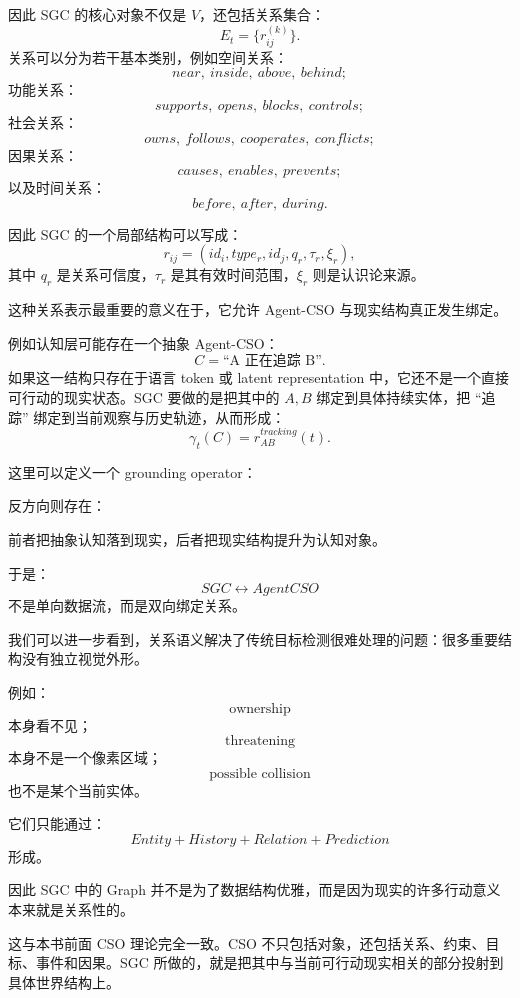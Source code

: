 因此 SGC 的核心对象不仅是 \(V\)，还包括关系集合：
\[
E_t
=
\{
r_{ij}^{(k)}
\}.
\]
关系可以分为若干基本类别，例如空间关系：
\[
near,\ inside,\ above,\ behind;
\]
功能关系：
\[
supports,\ opens,\ blocks,\ controls;
\]
社会关系：
\[
owns,\ follows,\ cooperates,\ conflicts;
\]
因果关系：
\[
causes,\ enables,\ prevents;
\]
以及时间关系：
\[
before,\ after,\ during.
\]

因此 SGC 的一个局部结构可以写成：
\[
r_{ij}
=
\left(
id_i,
type_r,
id_j,
q_r,
\tau_r,
\xi_r
\right),
\]
其中 \(q_r\) 是关系可信度，\(\tau_r\) 是其有效时间范围，\(\xi_r\) 则是认识论来源。

这种关系表示最重要的意义在于，它允许 Agent-CSO 与现实结构真正发生绑定。

例如认知层可能存在一个抽象 Agent-CSO：
\[
C=
\text{``A 正在追踪 B''}.
\]
如果这一结构只存在于语言 token 或 latent representation 中，它还不是一个直接可行动的现实状态。SGC 要做的是把其中的 \(A,B\) 绑定到具体持续实体，把 ``追踪'' 绑定到当前观察与历史轨迹，从而形成：
\[
\gamma_t(C)
=
r_{AB}^{tracking}(t).
\]

这里可以定义一个 grounding operator：
\begin{statementbox}
\centering
{}
\end{statementbox}

反方向则存在：
\begin{statementbox}
\centering
{}
\end{statementbox}

前者把抽象认知落到现实，后者把现实结构提升为认知对象。

于是：
\[
SGC
\leftrightarrow
AgentCSO
\]
不是单向数据流，而是双向绑定关系。

我们可以进一步看到，关系语义解决了传统目标检测很难处理的问题：很多重要结构没有独立视觉外形。

例如：
\[
\text{ownership}
\]
本身看不见；
\[
\text{threatening}
\]
本身不是一个像素区域；
\[
\text{possible collision}
\]
也不是某个当前实体。

它们只能通过：
\[
Entity + History + Relation + Prediction
\]
形成。

因此 SGC 中的 Graph 并不是为了数据结构优雅，而是因为现实的许多行动意义本来就是关系性的。

这与本书前面 CSO 理论完全一致。CSO 不只包括对象，还包括关系、约束、目标、事件和因果。SGC 所做的，就是把其中与当前可行动现实相关的部分投射到具体世界结构上。

